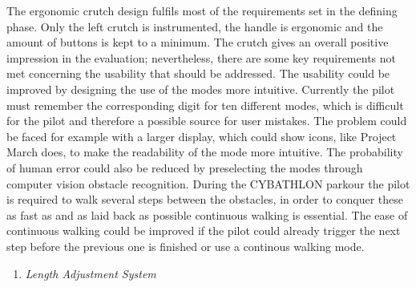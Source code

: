 \documentclass[conference,a4paper]{IEEEtran}
\begin{document}
The ergonomic crutch design fulfils most of the requirements set in the defining phase. Only the left crutch is instrumented, the handle is ergonomic and the amount of buttons is kept to a minimum.
The crutch gives an overall positive impression in the evaluation; nevertheless, there are some key requirements not met concerning the usability that should be addressed.
The usability could be improved by designing the use of the modes more intuitive. Currently the pilot must remember the corresponding digit for ten different modes, which is difficult for the pilot and therefore a possible source for user mistakes. The problem could be faced for example with a larger display, which could show icons, like Project March \cite{projectmarch} does, to make the readability of the mode more intuitive. The probability of human error could also be reduced by preselecting the modes through computer vision obstacle recognition.
During the CYBATHLON parkour the pilot is required to walk several steps between the obstacles, in order to conquer these as fast as and as laid back as possible continuous walking is essential. The ease of continuous walking could be improved if the pilot could already trigger the next step before the previous one is finished or use a continous walking mode.\\

\begin{enumerate}[\textit{ii.}]
\item{\textit{Length Adjustment System}}
\end{enumerate}
\end{document}
